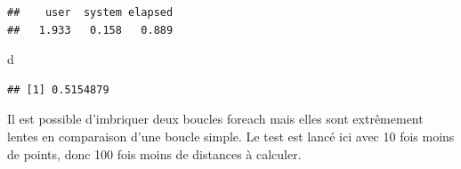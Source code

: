 \documentclass[
  12pt,
  french,
  a4paper,
  extrafontsizes,onecolumn,openright
  ]{memoir}
\newenvironment{Shaded}{\begin{snugshade}}{\end{snugshade}}
\newcommand{\AttributeTok}[1]{\textcolor[rgb]{0.13,0.29,0.53}{#1}}
\newcommand{\ControlFlowTok}[1]{\textcolor[rgb]{0.13,0.29,0.53}{\textbf{#1}}}
\newcommand{\DecValTok}[1]{\textcolor[rgb]{0.00,0.00,0.81}{#1}}
\newcommand{\FunctionTok}[1]{\textcolor[rgb]{0.13,0.29,0.53}{\textbf{#1}}}
\newcommand{\NormalTok}[1]{#1}
\newcommand{\OtherTok}[1]{\textcolor[rgb]{0.56,0.35,0.01}{#1}}
\newcommand{\SpecialCharTok}[1]{\textcolor[rgb]{0.81,0.36,0.00}{\textbf{#1}}}
\newcommand{\StringTok}[1]{\textcolor[rgb]{0.31,0.60,0.02}{#1}}
\begin{document}
\begin{verbatim}
##    user  system elapsed 
##   1.933   0.158   0.889
\end{verbatim}

\begin{Shaded}
\begin{Highlighting}[]
\NormalTok{d}
\end{Highlighting}
\end{Shaded}

\begin{verbatim}
## [1] 0.5154879
\end{verbatim}

\normalsize

Il est possible d'imbriquer deux boucles foreach mais elles sont extrêmement lentes en comparaison d'une boucle simple.
Le test est lancé ici avec 10 fois moins de points, donc 100 fois moins de distances à calculer.

\scriptsize

\begin{Shaded}
\end{Shaded}
\end{document}
